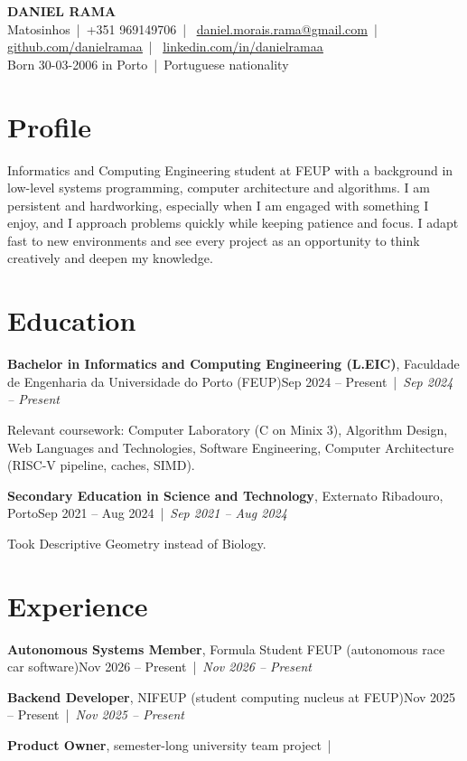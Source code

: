 \documentclass[11pt]{article}
\newcommand{\entry}[3]{%
  \textbf{#1}, #2\ifx\relax#3\relax\else\ {\color{dategray}|}\ {\color{dategray}\itshape #3}\fi\par}
\newcommand{\sep}{\ |\ }
\begin{document}
{\color{accent}\fontsize{24}{28}\selectfont\bfseries DANIEL RAMA}\\[2pt]
{\small\color{dategray}
Matosinhos\sep +351 969149706\sep
\href{mailto:daniel.morais.rama@gmail.com}{\underline{daniel.morais.rama@gmail.com}}\sep
\href{https://github.com/danielramaa}{\underline{github.com/danielramaa}}\sep
\href{https://linkedin.com/in/danielramaa}{\underline{linkedin.com/in/danielramaa}}\\
Born 30-03-2006 in Porto\sep Portuguese nationality}

\section{Profile}
Informatics and Computing Engineering student at FEUP with a background in low-level systems programming,
computer architecture and algorithms. I am persistent and hardworking, especially when I am engaged with
something I enjoy, and I approach problems quickly while keeping patience and focus. I adapt fast to new
environments and see every project as an opportunity to think creatively and deepen my knowledge.

\section{Education}
\entry{Bachelor in Informatics and Computing Engineering (L.EIC)}
      {Faculdade de Engenharia da Universidade do Porto (FEUP)}
      {Sep 2024 -- Present}
Relevant coursework: Computer Laboratory (C on Minix 3), Algorithm Design, Web Languages and Technologies,
Software Engineering, Computer Architecture (RISC-V pipeline, caches, SIMD).

\entry{Secondary Education in Science and Technology}
      {Externato Ribadouro, Porto}
      {Sep 2021 -- Aug 2024}
Took Descriptive Geometry instead of Biology.

\section{Experience}
\entry{Autonomous Systems Member}
      {Formula Student FEUP (autonomous race car software)}
      {Nov 2026 -- Present}
\entry{Backend Developer}
      {NIFEUP (student computing nucleus at FEUP)}
      {Nov 2025 -- Present}
\entry{Product Owner}
      {semester-long university team project}
      {}   %
\end{document}
